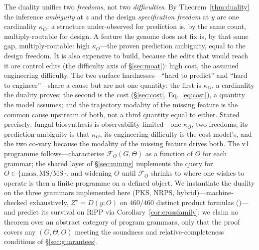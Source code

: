 \begin{remark}
The duality unifies two \emph{freedoms}, not two \emph{difficulties}. By Theorem~\ref{thm:duality} the
inference \emph{ambiguity} at $z$ and the design \emph{specification freedom} at $y$ are one cardinality
$\kappa_O$: a structure under-observed for prediction is, by the same count, multiply-routable for design. A
feature the genome does not fix is, by that same gap, multiply-routable: high $\kappa_O$---the proven
prediction ambiguity, equal to the design freedom. It is also expensive to build, because the edits that
would reach it are control edits (the difficulty axis of \S\ref{sec:moat}): high cost, the assumed
engineering difficulty. The two surface hardnesses---``hard to predict'' and ``hard to engineer''---share a
cause but are not one quantity: the first is $\kappa_O$, a cardinality the duality proves; the second is the
cost (\S\ref{sec:cost}, Eq.~\eqref{eq:cost}), a quantity the model assumes; and the trajectory modality of
the missing feature is the common cause upstream of both, not a third quantity equal to either. Stated
precisely: fungal biosynthesis is observability-limited---one $\kappa_O$, two freedoms; its prediction
ambiguity is that $\kappa_O$, its engineering difficulty is the cost model's, and the two co-vary because the
modality of the missing feature drives both. The v1 programme follows---characterise $\mathcal{F}_O(G,\Theta)$ as a function
of $O$ for each grammar; the shared layer of \S\ref{sec:mining} implements the query for
$O\in\{\text{mass},\text{MS/MS}\}$, and widening $O$ until $\mathcal{F}_O$ shrinks to where one wishes to
operate is then a finite programme on a defined object. We instantiate the duality on the three grammars
implemented here (PKS, NRPS, hybrid)---machine-checked exhaustively, $Z^\star{=}D(y;O)$ on $460/460$ distinct
product formulas ()---and predict its survival on RiPP via Corollary~\ref{cor:crossfamily}; we claim
no theorem over an abstract category of program grammars, only that the proof covers any $(G,\Theta,O)$
meeting the soundness and relative-completeness conditions of \S\ref{sec:guarantees}.
\end{remark}

